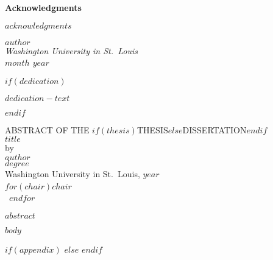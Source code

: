 \documentclass[12pt, oneside, openany]{book}
\begin{document}
\cleardoublepage
{}
{}
\doublespacing
\begin{center}
    \textbf{\Huge Acknowledgments}
\end{center}

$acknowledgments$

\hfill $author$\\
\textit{Washington University in St.~Louis}\\
\textit{$month$ $year$}

$if(dedication)$
    \clearpage
    \null
    \vfill
    \begin{center}
        $dedication-text$
    \end{center}
    \vfill
$endif$

\cleardoublepage
{}
{}
\begin{center}
    ABSTRACT OF THE $if(thesis)$THESIS$else$DISSERTATION$endif$\\
    $title$\\
    by\\
    $author$\\
    $degree$\\
    Washington University in St.~Louis, $year$\\
    $for(chair)$$chair$~\\~$endfor$
\end{center}
$abstract$

\mainmatter

$body$

$if(appendix)$
$else$
\clearpage
\singlespacing
\setlength\bibitemsep{\baselineskip}
\printbibliography[heading=bibintoc]
$endif$
\end{document}
